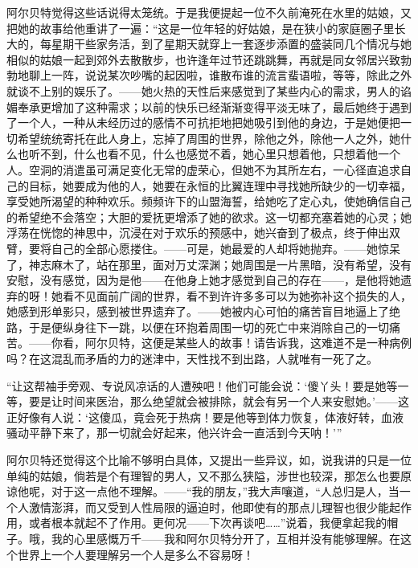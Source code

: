 \documentclass[12pt,oneside]{book}
\begin{document}
阿尔贝特觉得这些话说得太笼统。于是我便提起一位不久前淹死在水里的姑娘，又把她的故事给他重讲了一遍：“这是一位年轻的好姑娘，是在狭小的家庭圈子里长大的，每星期干些家务活，到了星期天就穿上一套逐步添置的盛装同几个情况与她相似的姑娘一起到郊外去散散步，也许逢年过节还跳跳舞，再就是同女邻居兴致勃勃地聊上一阵，说说某次吵嘴的起因啦，谁散布谁的流言蜚语啦，等等，除此之外就谈不上别的娱乐了。——她火热的天性后来感觉到了某些内心的需求，男人的谄媚奉承更增加了这种需求；以前的快乐已经渐渐变得平淡无味了，最后她终于遇到了一个人，一种从未经历过的感情不可抗拒地把她吸引到他的身边，于是她便把一切希望统统寄托在此人身上，忘掉了周围的世界，除他之外，除他一人之外，她什么也听不到，什么也看不见，什么也感觉不着，她心里只想着他，只想着他一个人。空洞的消遣虽可满足变化无常的虚荣心，但她不为其所左右，一心径直追求自己的目标，她要成为他的人，她要在永恒的比翼连理中寻找她所缺少的一切幸福，享受她所渴望的种种欢乐。频频许下的山盟海誓，给她吃了定心丸，使她确信自己的希望绝不会落空；大胆的爱抚更增添了她的欲求。这一切都充塞着她的心灵；她浮荡在恍惚的神思中，沉浸在对于欢乐的预感中，她兴奋到了极点，终于伸出双臂，要将自己的全部心愿搂住。——可是，她最爱的人却将她抛弃。——她惊呆了，神志麻木了，站在那里，面对万丈深渊；她周围是一片黑暗，没有希望，没有安慰，没有感觉，因为是他——在他身上她才感觉到自己的存在——，是他将她遗弃的呀！她看不见面前广阔的世界，看不到许许多多可以为她弥补这个损失的人，她感到形单影只，感到被世界遗弃了。——她被内心可怕的痛苦盲目地逼上了绝路，于是便纵身往下一跳，以便在环抱着周围一切的死亡中来消除自己的一切痛苦。——你看，阿尔贝特，这便是某些人的故事！请告诉我，这难道不是一种病例吗？在这混乱而矛盾的力的迷津中，天性找不到出路，人就唯有一死了之。

“让这帮袖手旁观、专说风凉话的人遭殃吧！他们可能会说：‘傻丫头！要是她等一等，要是让时间来医治，那么绝望就会被排除，就会有另一个人来安慰她。’——这正好像有人说：‘这傻瓜，竟会死于热病！要是他等到体力恢复，体液好转，血液骚动平静下来了，那一切就会好起来，他兴许会一直活到今天呐！’”

阿尔贝特还觉得这个比喻不够明白具体，又提出一些异议，如，说我讲的只是一位单纯的姑娘，倘若是个有理智的男人，又不那么狭隘，涉世也较深，那怎么也要原谅他呢，对于这一点他不理解。——“我的朋友，”我大声嚷道，“人总归是人，当一个人激情澎湃，而又受到人性局限的逼迫时，他即使有的那点儿理智也很少能起作用，或者根本就起不了作用。更何况——下次再谈吧……”说着，我便拿起我的帽子。哦，我的心里感慨万千——我和阿尔贝特分开了，互相并没有能够理解。在这个世界上一个人要理解另一个人是多么不容易呀！
\end{document}
